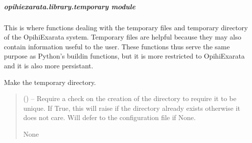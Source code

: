 \documentclass[letterpaper,11pt,english]{sphinxmanual}
\begin{document}
\subparagraph{opihiexarata.library.temporary module}
\label{\detokenize{code/opihiexarata.library.temporary:module-opihiexarata.library.temporary}}\label{\detokenize{code/opihiexarata.library.temporary:opihiexarata-library-temporary-module}}\label{\detokenize{code/opihiexarata.library.temporary::doc}}
\sphinxAtStartPar
This is where functions dealing with the temporary files and temporary
directory of the OpihiExarata system. Temporary files are helpful because they
may also contain information useful to the user. These functions thus serve the
same purpose as Python’s build\sphinxhyphen{}in functions, but it is more restricted to
OpihiExarata and it is also more persistant.

\begin{savenotes}\begin{fulllineitems}
\label{\detokenize{code/opihiexarata.library.temporary:opihiexarata.library.temporary.create_temporary_directory}}
\pysigstartsignatures
{}
\pysigstopsignatures
\sphinxAtStartPar
Make the temporary directory.
\begin{quote}\begin{description}
\sphinxAtStartPar
{} (\sphinxstyleliteralemphasis{\sphinxupquote{, }}) – Require a check on the creation of the directory to require it to be
unique. If True, this will raise if the directory already exists
otherwise it does not care. Will defer to the configuration file
if None.

\sphinxAtStartPar
None

\end{description}\end{quote}

\end{fulllineitems}\end{savenotes}
\end{document}
